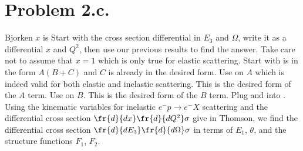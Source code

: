 \documentclass{article}
\begin{document}
\section*{Problem 2.c.}
Bjorken $x$ is
Start with the cross section differential in $E_3$ and $\Omega$, write it as a differential $x$ and $Q^2$, then use our previous results to find the answer. Take care not to assume that $x=1$ which is only true for elastic scattering. Start with 
 is in the form $A(B+C)$ and $C$ is already in the desired form. Use  on $A$ which is indeed valid for both elastic and inelastic scattering.
This is the desired form of the $A$ term. Use  on $B$.
This is the desired form of the $B$ term. Plug  and  into .
Using the kinematic variables for inelastic $e^{-}p\rightarrow e^{-}X$ scattering and the differential cross section $\fr{d}{dx}\fr{d}{dQ^2}\sigma$ give in Thomson, we find the differential cross section $\fr{d}{dE_3}\fr{d}{d\Omega}\sigma$ in terms of $E_1$, $\theta$, and the structure functions $F_1$, $F_2$.
\end{document}

